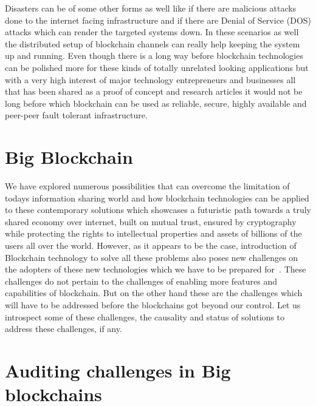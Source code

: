 Disasters can be of some other forms as well like if there are
malicious attacks done to the internet facing infrastructure and if
there are Denial of Service (DOS)\cite{paloalto8} attacks which 
can render the targeted systems down.
In these scenarios as well the distributed
setup of blockchain channels can really help keeping the system up and
running. Even though there is a long way before blockchain technologies
can be polished more for these kinds of totally unrelated looking
applications but with a very high interest of major technology
entrepreneurs and businesses all that has been shared as a proof of
concept and research articles it would not be long before which
blockchain can be used as reliable, secure, highly available and
peer-peer fault tolerant infrastructure.


\section{Big Blockchain}

We have explored numerous possibilities that can overcome the
limitation of todays information sharing world and how blockchain
technologies can be applied to these contemporary solutions which
showcases a futuristic path towards a truly shared economy over
internet, built on mutual trust, ensured by cryptography while
protecting the rights to intellectual properties and assets of
billions of the users all over the world. However, as it appears to be
the case, introduction of Blockchain technology to solve all these
problems also poses new challenges on the adopters of these new
technologies which we have to be prepared for~\cite{smith31}. These
challenges do not pertain to the challenges of enabling more features
and capabilities of blockchain. But on the other hand these are the
challenges which will have to be addressed before the blockchains got
beyond our control. Let us introspect some of these challenges, the
causality and status of solutions to address these challenges, if any.

\section{Auditing challenges in Big blockchains}

